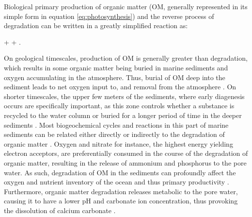 \documentclass[gmd, manuscript]{copernicus}
\begin{document}
Biological primary production of organic matter (OM, generally represented in its simple form  in equation \ref{eq:photosynthesis}) and the reverse process of degradation can be written in a greatly simplified reaction as:
\begin{reaction}
+ \rightleftharpoons {} + .\label{eq:photosynthesis}
\end{reaction}
On geological timescales, production of OM is generally greater than degradation, which results in some organic matter being buried in marine sediments and oxygen accumulating in the atmosphere. 
Thus, burial of OM deep into the sediment leads to net oxygen input to, and  removal from the atmosphere \citep{berner_phanerozoic_2004}. 
On shorter timescales, the upper few meters of the sediments, where early diagenesis occurs are specifically important, as this zone controls whether a substance is recycled 
to the water column or buried for a longer period of time in the deeper sediments \citep{hensen_benthic_2006}. 
Most biogeochemical cycles and reactions in this part of marine sediments can be related either directly or indirectly to the degradation of organic matter \citep[][]{middelburg_organic_1993, arndt_quantifying_2013}. 
Oxygen and nitrate for instance, the highest energy yielding electron acceptors, are preferentially consumed in the course of the degradation of organic matter, resulting in the release of ammonium and phosphorus to the pore water. 
As such, degradation of OM in the sediments can profoundly affect the oxygen and nutrient inventory of the ocean and thus primary productivity \citep{van_cappellen_benthic_1994, lenton_redfield_2000}. 
Furthermore, organic matter degradation releases metabolic  to the pore water, causing it to have a lower pH and carbonate ion concentration, thus provoking the dissolution of calcium carbonate  \citep{emerson_carbon_1981}.


\end{document}
